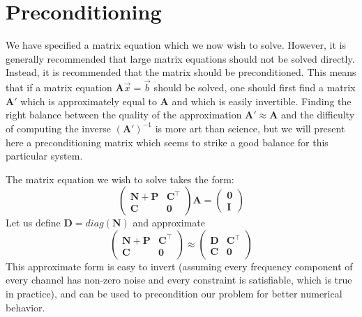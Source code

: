 \section{Preconditioning}

We have specified a matrix equation which we now wish to solve.  However, it is generally recommended that large matrix equations should not be solved directly.  Instead, it is recommended that the matrix should be preconditioned.  This means that if a matrix equation $\mathbf{A}\vec{x} = \vec{b}$ should be solved, one should first find a matrix $\mathbf{A}'$ which is approximately equal to $\mathbf{A}$ and which is easily invertible.  Finding the right balance between the quality of the approximation $\mathbf{A}' \approx \mathbf{A}$ and the difficulty of computing the inverse $\left(\mathbf{A}'\right)^{-1}$ is more art than science, but we will present here a preconditioning matrix which seems to strike a good balance for this particular system.

The matrix equation we wish to solve takes the form:
\[\begin{pmatrix}
\mathbf{N}+\mathbf{P} & \mathbf{C}^\top\\
\mathbf{C} & \mathbf{0}
\end{pmatrix}
\mathbf{A} = 
\begin{pmatrix}
\mathbf{0} \\ \mathbf{I}
\end{pmatrix}\]
Let us define $\mathbf{D} = diag(\mathbf{N})$ and approximate
\begin{equation}\begin{pmatrix}
\mathbf{N}+\mathbf{P} & \mathbf{C}^\top\\
\mathbf{C} & \mathbf{0}
\end{pmatrix}
\approx
\begin{pmatrix}
\mathbf{D} & \mathbf{C}^\top \\
\mathbf{C} & \mathbf{0}
\end{pmatrix}\end{equation}
This approximate form is easy to invert (assuming every frequency component of every channel has non-zero noise and every constraint is satisfiable, which is true in practice), and can be used to precondition our problem for better numerical behavior.

